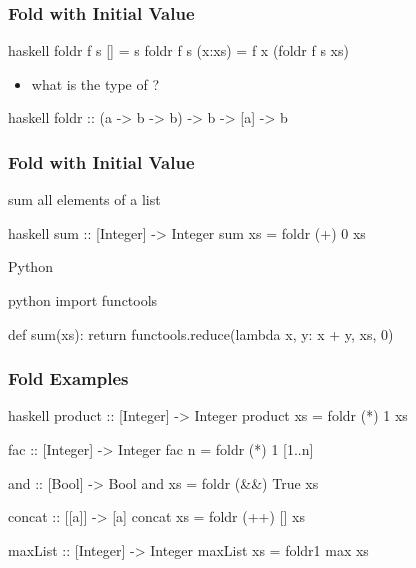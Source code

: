 \documentclass[dvipsnames]{beamer}
\theoremstyle{plain}
\begin{document}
\begin{frame}[fragile]
  \frametitle{Fold with Initial Value}

  \begin{exampleblock}{}
    \begin{pygments}{haskell}
foldr f s []     = s
foldr f s (x:xs) = f x (foldr f s xs)
    \end{pygments}

    \pause
    \begin{itemize}
      \item what is the type of ?
    \end{itemize}

    \begin{pygments}{haskell}
foldr :: (a -> b -> b) -> b -> [a] -> b
    \end{pygments}
  \end{exampleblock}
\end{frame}

\begin{frame}[fragile]
  \frametitle{Fold with Initial Value}

  \begin{exampleblock}{sum all elements of a list}
    \begin{pygments}{haskell}
sum :: [Integer] -> Integer
sum xs = foldr (+) 0 xs
    \end{pygments}
  \end{exampleblock}

  \bigskip
  \begin{exampleblock}{Python}
    \begin{pygments}{python}
import functools

def sum(xs):
  return functools.reduce(lambda x, y: x + y, xs, 0)
    \end{pygments}
  \end{exampleblock}
\end{frame}

\begin{frame}[fragile]
  \frametitle{Fold Examples}

  \begin{exampleblock}{}
    \begin{pygments}{haskell}
product :: [Integer] -> Integer
product xs = foldr (*) 1 xs

fac :: [Integer] -> Integer
fac n = foldr (*) 1 [1..n]

and :: [Bool] -> Bool
and xs = foldr (&&) True xs

concat :: [[a]] -> [a]
concat xs = foldr (++) [] xs

maxList :: [Integer] -> Integer
maxList xs = foldr1 max xs
    \end{pygments}
  \end{exampleblock}
\end{frame}
\end{document}
